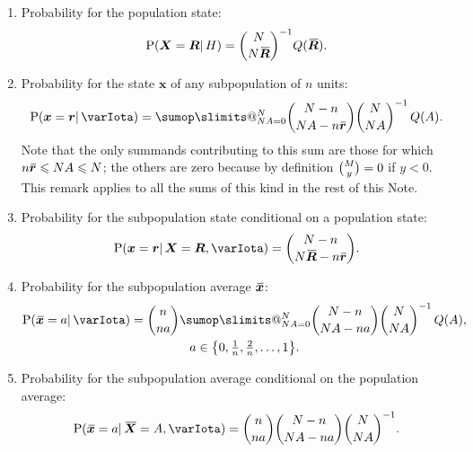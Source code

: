 \documentclass{article}
\makeatletter
\theoremstyle{remark}
\theoremstyle{innote}
\def\sum{\DOTSI\sumop\slimits@}
\renewcommand*{\|}{\mathpunct{|}}%
\renewcommand{\le}{\leqslant}%
\DeclarePairedDelimiter\set{\{}{\}}
\newcommand*{\p}{\mathrm{P}}%
\theoremstyle{simple}
\newcommand*{\widebar}[1]{{\mkern1.5mu\skew{2}\overline{\mkern-1.5mu#1\mkern-1.5mu}\mkern 1.5mu}}
\newcommand*{\av}{\widebar} %
\newcommand*{\sav}{\widebar} %
\newcommand*{\yxx}{x}%
\newcommand*{\yx}{\bm{\yxx}}%
\newcommand*{\yxs}{\sav{\yx}}%
\newcommand*{\yX}{\bm{X}}%
\newcommand*{\yXf}{\av{\yX}}%
\newcommand*{\yr}{\bm{r}}%
\newcommand*{\yrs}{\sav{\yr}}%
\newcommand*{\yR}{\bm{R}}%
\newcommand*{\yRf}{\av{\yR}}%
\newcommand*{\yH}{\varIota}
\makeatother
\begin{document}
\begin{enumerate}%
  \medskip\item\label{noitem:tot_plaus}Probability for the population state:
\begin{equation}
  \label{noeq:joint_plaus_N_homog}
  \p(\yX = \yR \| H) = \binom{N}{N\yRf}^{-1} Q(\yRf).
\end{equation}

\medskip
\item\label{noitem:marginal}Probability for the state $\yx$ of any subpopulation
  of $n$ units:
\begin{equation}
  \label{noeq:marginal}
    \p(\yx = \yr \| \yH) =
\sum_{N A =0}^{N} 
\binom{N-n}{N A-n\yrs}\binom{N}{N A}^{-1}\,
Q(A).
\end{equation}
Note that the only summands contributing to this sum are those for which
$n\yrs \le NA \le N$; the others are zero because by definition
$\tbinom{M}{y}=0$ if $y<0$. This remark applies to all the sums of this
kind in the rest of this Note.

\medskip
\item\label{noitem:conditional}Probability for the subpopulation
  state conditional on a population state:
\begin{equation}
  \label{noeq:conditional_total_state}
  \p(\yx = \yr \| \yX = \yR, \yH)
=
\binom{N-n}{N \yRf-n \yrs}.
\end{equation}

\medskip
\item\label{noitem:marginal_average}Probability for the
  subpopulation average $\yxs$:
\begin{multline}
  \label{noeq:subpop_average}
  \p(\yxs = a  \| \yH) = \binom{n}{n a}
 \sum_{N A=0}^{N}
\binom{N-n}{N A-n a}\binom{N}{N A}^{-1}\,
Q(A),
\\
a \in \set*{0,\tfrac{1}{n},\tfrac{2}{n},\dotsc,1}.
\end{multline}

\medskip
\item\label{noitem:conditional_average}Probability for the subpopulation
  average conditional on the population average:
\begin{equation}
  \label{noeq:conditional_prob}
  \p(\yxs = a \| \yXf = A, \yH)
=
\binom{n}{n a}\binom{N-n}{N A-n a}\binom{N}{N A}^{-1}.
\end{equation}


\end{enumerate}
\end{document}
